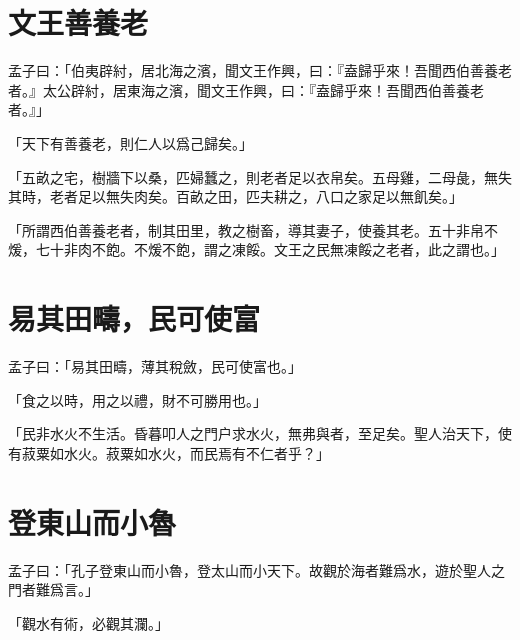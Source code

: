 \section{文王善養老}

孟子曰：「伯夷辟紂，居北海之濱，聞文王作興，曰：『盍歸乎來！吾聞西伯善養老者。』太公辟紂，居東海之濱，聞文王作興，曰：『盍歸乎來！吾聞西伯善養老者。』」

「天下有善養老，則仁人以爲己歸矣。」

「五畝之宅，樹牆下以桑，匹婦蠶之，則老者足以衣帛矣。五母雞，二母彘，無失其時，老者足以無失肉矣。百畝之田，匹夫耕之，八口之家足以無飢矣。」

「所謂西伯善養老者，制其田里，教之樹畜，導其妻子，使養其老。五十非帛不煖，七十非肉不飽。不煖不飽，謂之凍餒。文王之民無凍餒之老者，此之謂也。」\par {}

\section{易其田疇，民可使富}

孟子曰：「易其田疇，薄其稅斂，民可使富也。」

「食之以時，用之以禮，財不可勝用也。」

「民非水火不生活。昏暮叩人之門户求水火，無弗與者，至足矣。聖人治天下，使有菽粟如水火。菽粟如水火，而民焉有不仁者乎？」\par {}

\section{登東山而小魯}

孟子曰：「孔子登東山而小魯，登太山而小天下。故觀於海者難爲水，遊於聖人之門者難爲言。」

「觀水有術，必觀其瀾。」

